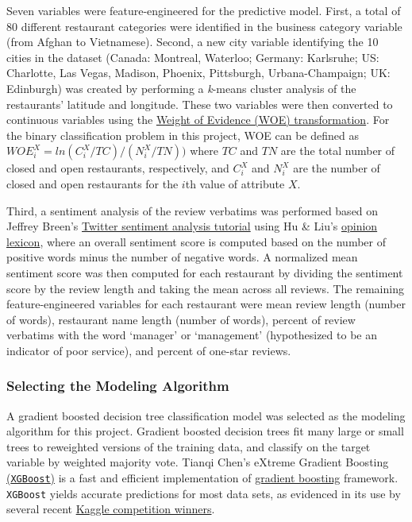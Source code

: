 \documentclass[]{article}
\begin{document}
Seven variables were feature-engineered for the predictive model. First,
a total of 80 different restaurant categories were identified in the
business category variable (from Afghan to Vietnamese). Second, a new
city variable identifying the 10 cities in the dataset (Canada:
Montreal, Waterloo; Germany: Karlsruhe; US: Charlotte, Las Vegas,
Madison, Phoenix, Pittsburgh, Urbana-Champaign; UK: Edinburgh) was
created by performing a \emph{k}-means cluster analysis of the
restaurants' latitude and longitude. These two variables were then
converted to continuous variables using the
\href{http://www.sciencedirect.com/science/article/pii/S0167923615000275}{Weight
of Evidence (WOE) transformation}. For the binary classification problem
in this project, WOE can be defined as
\(WOE^X_i = ln (C^X_i / TC) / (N^X_i / TN))\) where \(TC\) and \(TN\)
are the total number of closed and open restaurants, respectively, and
\(C^X_i\) and \(N^X_i\) are the number of closed and open restaurants
for the \(i\)th value of attribute \(X\).

Third, a sentiment analysis of the review verbatims was performed based
on Jeffrey Breen's
\href{https://github.com/jeffreybreen/twitter-sentiment-analysis-tutorial-201107}{Twitter
sentiment analysis tutorial} using Hu \& Liu's
\href{https://www.cs.uic.edu/~liub/FBS/sentiment-analysis.html\#lexicon}{opinion
lexicon}, where an overall sentiment score is computed based on the
number of positive words minus the number of negative words. A
normalized mean sentiment score was then computed for each restaurant by
dividing the sentiment score by the review length and taking the mean
across all reviews. The remaining feature-engineered variables for each
restaurant were mean review length (number of words), restaurant name
length (number of words), percent of review verbatims with the word
`manager' or `management' (hypothesized to be an indicator of poor
service), and percent of one-star reviews.

\subsubsection{Selecting the Modeling
Algorithm}\label{selecting-the-modeling-algorithm}

A gradient boosted decision tree classification model was selected as
the modeling algorithm for this project. Gradient boosted decision trees
fit many large or small trees to reweighted versions of the training
data, and classify on the target variable by weighted majority vote.
Tianqi Chen's eXtreme Gradient Boosting
\href{https://github.com/dmlc/xgboost}{(\texttt{XGBoost})} is a fast and
efficient implementation of
\href{https://en.wikipedia.org/wiki/Gradient_boosting}{gradient
boosting} framework. \texttt{XGBoost} yields accurate predictions for
most data sets, as evidenced in its use by several recent
\href{https://github.com/dmlc/xgboost\#whats-new}{Kaggle competition
winners}.
\end{document}

